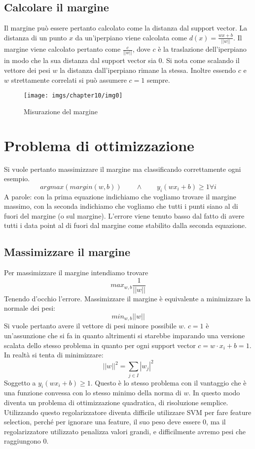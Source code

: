 	\subsection{Calcolare il margine}
	Il margine pu\`o essere pertanto calcolato come la distanza dal support vector.
	La distanza di un punto $x$ da un'iperpiano viene calcolata come $d(x) = \frac{wx+b}{||w||}$.
	Il margine viene calcolato pertanto come $\frac{c}{||w||}$, dove $c$ \`e la traslazione dell'iperpiano in modo che la sua distanza dal support vector sia $0$.
	Si nota come scalando il vettore dei pesi $w$ la distanza dall'iperpiano rimane la stessa.
	Inoltre essendo $c$ e $w$ strettamente correlati si pu\`o assumere $c=1$ sempre.
	
	\begin{figure}
		\centering
		\texttt{[image: imgs/chapter10/img0]}
		\caption{Misurazione del margine}
		\label{fig:chapter10-00}
	\end{figure}

\section{Problema di ottimizzazione}
Si vuole pertanto massimizzare il margine ma classificando correttamente ogni esempio.
$$argmax(margin(w,b))\qquad\land\qquad y_i(wx_i + b) \ge 1 \forall i$$
A parole: con la prima equazione indichiamo che vogliamo trovare il margine massimo, con la seconda indichiamo che vogliamo che tutti i punti siano al di fuori del margine (o sul margine).
L'errore viene tenuto basso dal fatto di avere tutti i data point al di fuori dal margine come stabilito dalla seconda equazione.

	\subsection{Massimizzare il margine}
	Per massimizzare il margine intendiamo trovare
	$$max_{w,b}\dfrac{1}{||w||}$$
	Tenendo d'occhio l'errore.
	Massimizzare il margine \`e equivalente a minimizzare la normale dei pesi:
	$$min_{w,b}||w||$$
	Si vuole pertanto avere il vettore di pesi minore possibile $w$.
	$c=1$ \`e un'assunzione che si fa in quanto altrimenti si starebbe imparando una versione scalata dello stesso problema in quanto per ogni support vector $c = w\cdot x_i +b = 1$.
	In realt\`a si tenta di minimizzare:
	$$||w||^2 = \sum\limits_{j\in I}|w_j|^2$$
	Soggetto a $y_i(wx_i+b) \ge 1$.
	Questo \`e lo stesso problema con il vantaggio che \`e una funzione convessa con lo stesso minimo della norma di $w$.
	In questo modo diventa un problema di ottimizzazione quadratica, di risoluzione semplice.
	Utilizzando questo regolarizzatore diventa difficile utilizzare SVM per fare feature selection, perché per ignorare una feature, il suo peso deve essere 0, ma il regolarizzatore utilizzato penalizza valori grandi, e difficilmente avremo pesi che raggiungono 0.

